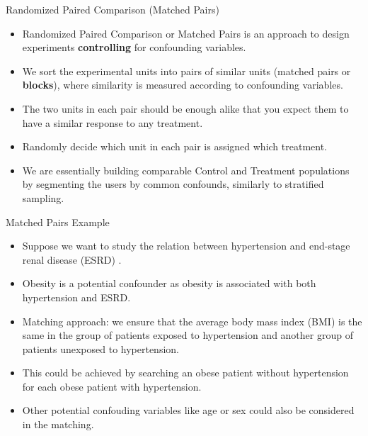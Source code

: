 \documentclass[handout]{beamer}
\begin{document}
\begin{frame}{Randomized Paired Comparison (Matched Pairs)}
\scriptsize{

\begin{itemize}

\item Randomized Paired Comparison or Matched Pairs is an approach to design experiments \textbf{controlling} for confounding variables. 

\item We sort the experimental units into pairs of similar units (matched pairs or \textbf{blocks}), where similarity is measured according to confounding variables.

\item  The two units in each pair should be enough alike that you expect them to have a similar response to any treatment.

\item Randomly decide which unit in each pair is assigned which treatment.

\item We are essentially building comparable Control and Treatment populations by segmenting the users by common confounds, similarly to stratified sampling.
  
\end{itemize}



} 
\end{frame}


\begin{frame}{Matched Pairs Example}
\scriptsize{

\begin{itemize}

\item Suppose we want to study the relation between hypertension and end-stage renal disease (ESRD) \cite{de2011matching}.

\item Obesity is a potential confounder as obesity is associated with both hypertension and ESRD. 

\item Matching approach: we ensure that the average body mass index (BMI) is the same in the group of patients exposed to hypertension and another group of patients unexposed to hypertension. 

\item This could be achieved by searching an obese patient without hypertension for each obese patient with hypertension.
  
\item Other potential confouding variables like age or sex could also be considered in the matching.  
  
\end{itemize}



} 
\end{frame}
\end{document}
